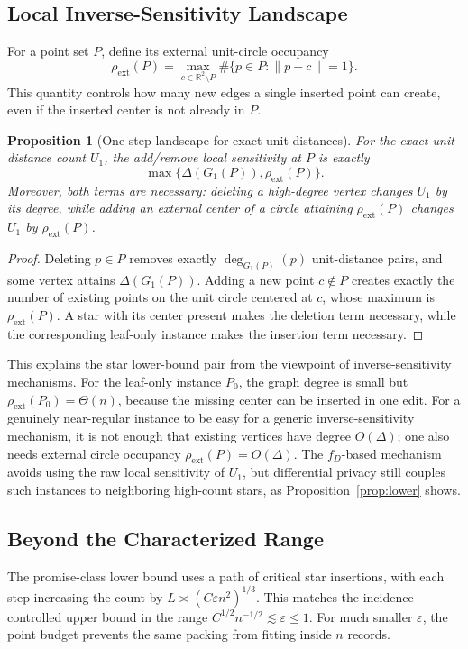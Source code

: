 \documentclass[11pt]{article}
\newtheorem{proposition}[theorem]{Proposition}
\newcommand{\R}{\mathbb{R}}
\newcommand{\eps}{\varepsilon}
\begin{document}
\subsection{Local Inverse-Sensitivity Landscape}

For a point set \(P\), define its external unit-circle occupancy
\[
\rho_{\mathrm{ext}}(P)=\max_{c\in\R^2\setminus P}\#\{p\in P:\|p-c\|=1\}.
\]
This quantity controls how many new edges a single inserted point can create, even if the inserted center is not already in \(P\).

\begin{proposition}[One-step landscape for exact unit distances]
\label{prop:local-landscape}
For the exact unit-distance count \(U_1\), the add/remove local sensitivity at \(P\) is exactly
\[
\max\{\Delta(G_1(P)),\rho_{\mathrm{ext}}(P)\}.
\]
Moreover, both terms are necessary: deleting a high-degree vertex changes \(U_1\) by its degree, while adding an external center of a circle attaining \(\rho_{\mathrm{ext}}(P)\) changes \(U_1\) by \(\rho_{\mathrm{ext}}(P)\).
\end{proposition}

\begin{proof}
Deleting \(p\in P\) removes exactly \(\deg_{G_1(P)}(p)\) unit-distance pairs, and some vertex attains \(\Delta(G_1(P))\). Adding a new point \(c\notin P\) creates exactly the number of existing points on the unit circle centered at \(c\), whose maximum is \(\rho_{\mathrm{ext}}(P)\). A star with its center present makes the deletion term necessary, while the corresponding leaf-only instance makes the insertion term necessary.
\end{proof}

This explains the star lower-bound pair from the viewpoint of inverse-sensitivity mechanisms. For the leaf-only instance \(P_0\), the graph degree is small but \(\rho_{\mathrm{ext}}(P_0)=\Theta(n)\), because the missing center can be inserted in one edit. For a genuinely near-regular instance to be easy for a generic inverse-sensitivity mechanism, it is not enough that existing vertices have degree \(O(\Delta)\); one also needs external circle occupancy \(\rho_{\mathrm{ext}}(P)=O(\Delta)\). The \(f_D\)-based mechanism avoids using the raw local sensitivity of \(U_1\), but differential privacy still couples such instances to neighboring high-count stars, as Proposition~\ref{prop:lower} shows.

\subsection{Beyond the Characterized Range}
The promise-class lower bound uses a path of critical star insertions, with each step increasing the count by \(L\asymp(C\eps n^2)^{1/3}\). This matches the incidence-controlled upper bound in the range \(C^{1/2}n^{-1/2}\lesssim\eps\le1\). For much smaller \(\eps\), the point budget prevents the same packing from fitting inside \(n\) records.
\end{document}
